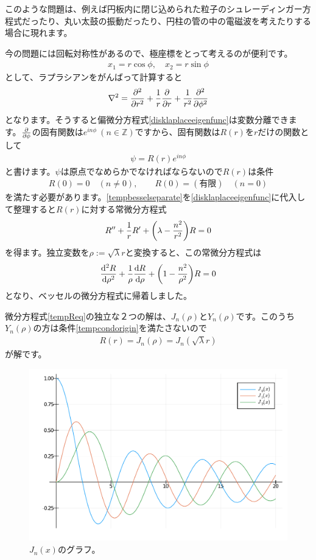 \documentclass[report,paper=a4, fontsize=12pt, line_length=16cm, number_of_lines=33,dvipdfmx]{jlreq}
\numberwithin{equation}{section}
\newcommand{\Zb}{\mathbb{Z}}
\begin{document}
このような問題は、例えば円板内に閉じ込められた粒子のシュレーディンガー方程式だったり、丸い太鼓の振動だったり、円柱の管の中の電磁波を考えたりする場合に現れます。

今の問題には回転対称性があるので、極座標をとって考えるのが便利です。
\begin{align}
  x_1=r\cos \phi,\quad x_2=r\sin\phi
\end{align}
として、ラプラシアンをがんばって計算すると
\begin{align}
  \laplacian=\pdv[2]{r}+\frac{1}{r}\pdv{r}+\frac{1}{r^2}\pdv[2]{\phi}
\end{align}
となります。そうすると偏微分方程式\eqref{disklaplaceeigenfunc}は変数分離できます。$\pdv{\phi}$の固有関数は$e^{in\phi} \ (n\in \Zb)$ですから、固有関数は$R(r)$を$r$だけの関数として
\begin{align}
  \psi=R(r)e^{in\phi}\label{tempbesselseparate}
\end{align}
と書けます。$\psi$は原点でなめらかでなければならないので$R(r)$は条件
\begin{align}
  R(0)=0 \quad (n\ne 0),\qquad R(0)=(\text{有限})\quad (n=0)
  \label{tempcondorigin}
\end{align}
を満たす必要があります。\eqref{tempbesselseparate}を\eqref{disklaplaceeigenfunc}に代入して整理すると$R(r)$に対する常微分方程式
\begin{align}
  R''+\frac{1}{r}R'+\qty(\lambda-\frac{n^2}{r^2})R=0
\end{align}
を得ます。独立変数を$\rho:=\sqrt{\lambda}r$と変換すると、この常微分方程式は
\begin{align}
  \dv[2]{R}{\rho}+\frac{1}{\rho}\dv{R}{\rho}+\qty(1-\frac{n^2}{\rho^2})R=0  \label{tempReq}
\end{align}
となり、ベッセルの微分方程式に帰着しました。

微分方程式\eqref{tempReq}の独立な２つの解は、$J_n(\rho)$と$Y_n(\rho)$です。このうち$Y_n(\rho)$の方は条件\eqref{tempcondorigin}を満たさないので
\begin{align}
  R(r)=J_n(\rho)=J_n(\sqrt{\lambda}r)
\end{align}
が解です。

\begin{figure}[htbp]
  \centering
  \includegraphics[width=13cm]{besselj2.pdf}
  \caption{$J_n(x)$のグラフ。}
  \label{fig:besselj2}
\end{figure}
\end{document}
